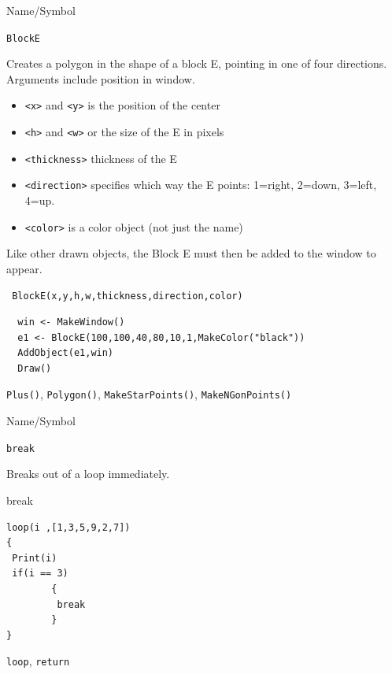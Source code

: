 \begin{desc}{Name/Symbol}

\item[Name/Symbol]  	\verb+BlockE+ 

\item[Description] Creates a polygon in the shape of a
 block E, pointing in one of four directions.
Arguments include position in window.
\begin{itemize}
\item \verb+<x>+ and \verb+<y>+ is the position of the center
\item \verb+<h>+ and \verb+<w>+ or the size of the E in pixels
\item \verb+<thickness>+ thickness of the E
\item \verb+<direction>+ specifies which way the E points:  1=right,
  2=down, 3=left, 4=up.
\item \verb+<color>+ is a color object (not just the name)
\end{itemize}

Like other drawn objects, the Block E must then be added to the window
to appear.

\item[Usage]		
\begin{verbatim}
 BlockE(x,y,h,w,thickness,direction,color)
\end{verbatim}

\item[Example]	
\begin{verbatim}
  win <- MakeWindow()
  e1 <- BlockE(100,100,40,80,10,1,MakeColor("black"))
  AddObject(e1,win)
  Draw()
\end{verbatim}

\item[See Also]   
\verb+Plus()+, \verb+Polygon()+, \verb+MakeStarPoints()+,
\verb+MakeNGonPoints()+
\end{desc}



\begin{desc}{Name/Symbol}
\item[Name/Symbol]  	\verb+break+

\item[Description]  	Breaks out of a loop immediately.

\item[Usage]        	break

\item[Example]
\begin{verbatim}
loop(i ,[1,3,5,9,2,7])
{
 Print(i)
 if(i == 3) 
        {
         break
        }
}
\end{verbatim}

\item[See Also]   	\verb+loop+, \verb+return+
\end{desc}

